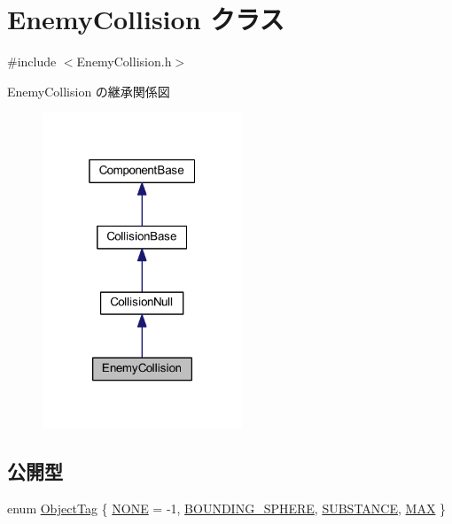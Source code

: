 \hypertarget{class_enemy_collision}{}\section{Enemy\+Collision クラス}
\label{class_enemy_collision}


{\ttfamily \#include $<$Enemy\+Collision.\+h$>$}



Enemy\+Collision の継承関係図\nopagebreak
\begin{figure}[H]
\begin{center}
\leavevmode
\includegraphics[width=169pt]{class_enemy_collision__inherit__graph}
\end{center}
\end{figure}
\subsection*{公開型}
\begin{DoxyCompactItemize}
\item 
enum \mbox{\hyperlink{class_enemy_collision_a8423c2c1dce9ba8ab2ba9bed82ee4843}{Object\+Tag}} \{ \mbox{\hyperlink{class_enemy_collision_a8423c2c1dce9ba8ab2ba9bed82ee4843a54855bb90bae23d3697d74e0b20462a2}{N\+O\+NE}} = -\/1, 
\mbox{\hyperlink{class_enemy_collision_a8423c2c1dce9ba8ab2ba9bed82ee4843a327f14f5b5cd28a3e605ff4f7066e8ce}{B\+O\+U\+N\+D\+I\+N\+G\+\_\+\+S\+P\+H\+E\+RE}}, 
\mbox{\hyperlink{class_enemy_collision_a8423c2c1dce9ba8ab2ba9bed82ee4843a8c9cd2ea0a1628d412fc501c91541ab0}{S\+U\+B\+S\+T\+A\+N\+CE}}, 
\mbox{\hyperlink{class_enemy_collision_a8423c2c1dce9ba8ab2ba9bed82ee4843a4283c301ae1d9317453c36d5923f7136}{M\+AX}}
 \}
\end{DoxyCompactItemize}
